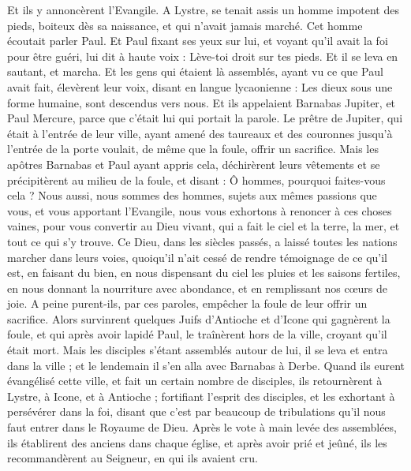 \begin{multicols}{2}
Et ils y annoncèrent l'Evangile.
A Lystre, se tenait assis un homme impotent des pieds, boiteux dès sa naissance, et qui n'avait jamais marché.
Cet homme écoutait parler Paul. Et Paul fixant ses yeux sur lui, et voyant qu'il avait la foi pour être guéri,
lui dit à haute voix : Lève-toi droit sur tes pieds. Et il se leva en sautant, et marcha.
Et les gens qui étaient là assemblés, ayant vu ce que Paul avait fait, élevèrent leur voix, disant en langue lycaonienne : Les dieux sous une forme humaine, sont descendus vers nous.
Et ils appelaient Barnabas Jupiter, et Paul Mercure, parce que c'était lui qui portait la parole.
Le prêtre de Jupiter, qui était à l’entrée de leur ville, ayant amené des taureaux et des couronnes jusqu'à l'entrée de la porte voulait, de même que la foule, offrir un sacrifice.
Mais les apôtres Barnabas et Paul ayant appris cela, déchirèrent leurs vêtements et se précipitèrent au milieu de la foule,
et disant : Ô hommes, pourquoi faites-vous cela ? Nous aussi, nous sommes des hommes, sujets aux mêmes passions que vous, et vous apportant l’Evangile, nous vous exhortons à renoncer à ces choses vaines, pour vous convertir au Dieu vivant, qui a fait le ciel et la terre, la mer, et tout ce qui s’y trouve.
Ce Dieu, dans les siècles passés, a laissé toutes les nations marcher dans leurs voies,
quoiqu'il n’ait cessé de rendre témoignage de ce qu’il est, en faisant du bien, en nous dispensant du ciel les pluies et les saisons fertiles, en nous donnant la nourriture avec abondance, et en remplissant nos cœurs de joie.
A peine purent-ils, par ces paroles, empêcher la foule de leur offrir un sacrifice.
Alors survinrent quelques Juifs d'Antioche et d'Icone qui gagnèrent la foule, et qui après avoir lapidé Paul, le traînèrent hors de la ville, croyant qu'il était mort.
Mais les disciples s'étant assemblés autour de lui, il se leva et entra dans la ville ; et le lendemain il s'en alla avec Barnabas à Derbe.
Quand ils eurent évangélisé cette ville, et fait un certain nombre de disciples, ils retournèrent à Lystre, à Icone, et à Antioche ;
fortifiant l'esprit des disciples, et les exhortant à persévérer dans la foi, disant que c'est par beaucoup de tribulations qu'il nous faut entrer dans le Royaume de Dieu.
Après le vote à main levée des assemblées, ils établirent des anciens dans chaque église, et après avoir prié et jeûné, ils les recommandèrent au Seigneur, en qui ils avaient cru.

\end{multicols}
